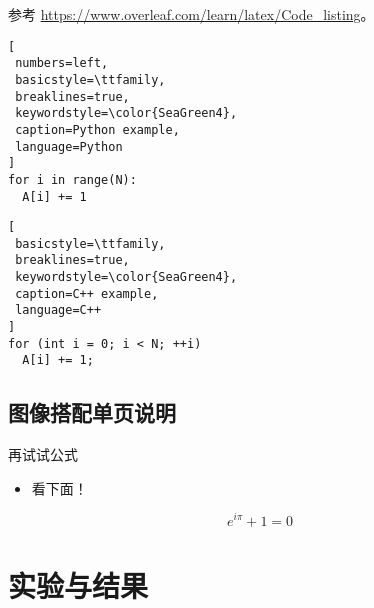 \documentclass[
    fontset=fandol,
    xcolor=x11names %
]{ctexbeamer}
\begin{document}
\begin{frame}

参考 \url{https://www.overleaf.com/learn/latex/Code_listing}。

\begin{minipage}{.49\linewidth}

\begin{lstlisting}[
 numbers=left,
 basicstyle=\ttfamily,
 breaklines=true,
 keywordstyle=\color{SeaGreen4},
 caption=Python example,
 language=Python
]
for i in range(N):
  A[i] += 1
\end{lstlisting}

\end{minipage}\begin{minipage}{.49\linewidth}

\begin{lstlisting}[
 basicstyle=\ttfamily,
 breaklines=true,
 keywordstyle=\color{SeaGreen4},
 caption=C++ example,
 language=C++
]
for (int i = 0; i < N; ++i)
  A[i] += 1;
\end{lstlisting}

\end{minipage}
    
\end{frame}

\subsection{图像搭配单页说明}

\begin{frame}

    \begin{block}{再试试公式}
        \begin{itemize}
            \item 看下面！
        \end{itemize}
    \end{block}

    \begin{equation}
        e^{i\pi}+1=0
    \end{equation}

\end{frame}

\section{实验与结果}
\end{document}
